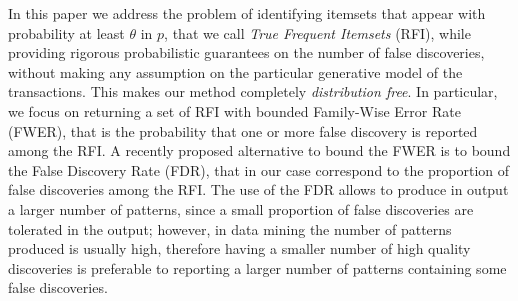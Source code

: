 In this paper we address the problem of
identifying itemsets that appear with probability at least $\theta$ in $p$,
that we call \emph{True Frequent Itemsets} (RFI), while providing rigorous
probabilistic guarantees on the number of false discoveries, without making any
assumption on the particular generative model of the transactions. This makes
our method completely \emph{distribution free}. In particular, we focus on
returning a set of RFI with bounded Family-Wise Error Rate (FWER), that is the
probability that one or more false discovery is reported among the RFI. A
recently proposed alternative to  bound the FWER is to bound the False Discovery
Rate (FDR), that in our case correspond to the proportion of false discoveries
among the RFI. The use of the FDR allows to produce in output a larger number of
patterns, since a small proportion of false discoveries are tolerated in the output;
however, in data mining the number of patterns produced is usually high,
therefore having a smaller number of high quality discoveries is preferable to
reporting a larger number of patterns containing some false discoveries.
\fi

\iffalse
{\bf XXX:} we should explain here what a statistical test is, what the FWER,
what the difference with the FDR, and so on. If we do it well here, we probably
do not need to do it again the preliminaries.

{\bf XXX:} We should really stress that we are not mining ``statistically
significant'' itemsets, as this would imply some kind of underlying model (e.g.,
``items appear independently in transactions'') that instead we do not have. I
believe we should actually somewhat comment on such models, which are clearly
too simplistic to be really useful/meaningful: in real/natural data generation
processes itemsets \emph{clearly} do not appear independently, so comparing the
dataset to such a model is only of limited value. 
\fi


